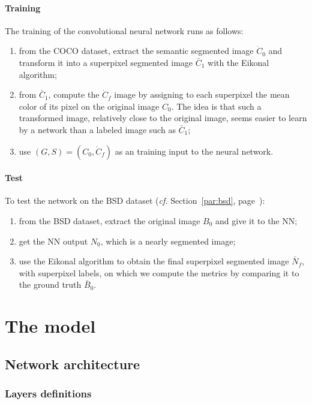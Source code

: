 \documentclass{article}
\begin{document}
        \paragraph{Training}
        The training of the convolutional neural network runs as follows:
        \begin{enumerate}
            \item from the COCO dataset, extract the semantic segmented image $\dot C_0$ and transform it into a superpixel segmented image $\bar C_1$ with the Eikonal algorithm;
            \item from $\bar C_1$, compute the $\dot C_f$ image by assigning to each superpixel the mean color of its pixel on the original image $C_0$. The idea is that such a transformed image, relatively close to the original image, seems easier to learn by a network than a labeled image such as $\bar C_1$;
            \item use $(G,S)=(C_0, \dot C_f)$ as an training input to the neural network.
        \end{enumerate}
        \paragraph{Test}
        To test the network on the BSD dataset (\textit{cf.} Section~\ref{par:bsd}, page~\pageref{par:bsd}):
        \begin{enumerate}
            \item from the BSD dataset, extract the original image $B_0$ and give it to the NN;
            \item get the NN output $N_0$, which is a nearly segmented image;
            \item use the Eikonal algorithm to obtain the final superpixel segmented image $\bar N_f$, with superpixel labels, on which we compute the metrics by comparing it to the ground truth $\bar B_0$.
        \end{enumerate}



\section{The model}
    \subsection{Network architecture}
        \subsubsection{Layers definitions}
\end{document}
